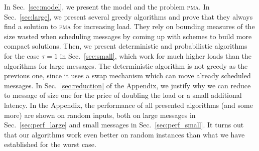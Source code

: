 \documentclass[a4paper,UKenglish,cleveref, autoref, thm-restate]{lipics-v2019}
\newcommand\pma{\textsc{pma}\xspace}
\begin{document}
In Sec.~\ref{sec:model}, we present the model and the problem \pma. In Sec.~\ref{sec:large},
we present several greedy algorithms and prove that they always find a solution to \pma for increasing load. 
They rely on bounding measures of the size wasted when scheduling messages by coming up with schemes to
build more compact solutions. Then, we present deterministic and probabilistic algorithms for the case $\tau = 1$ in Sec.~\ref{sec:small}, which work for much higher loads than the algorithms for large messages. The deterministic algorithm is not greedy as the previous one, since it uses a swap mechanism which can move already scheduled messages. 
 In Sec.~\ref{sec:reduction} of the Appendix, we justify why we can reduce to message of size one for the price of doubling the load or a small additional latency. In the Appendix, the performance of all presented algorithms (and some more) are shown on random inputs, both on large messages in Sec.~\ref{sec:perf_large} and small messages in Sec.~\ref{sec:perf_small}. It turns out that our algorithms work even better on random instances than what we have established for the worst case.
\end{document}
